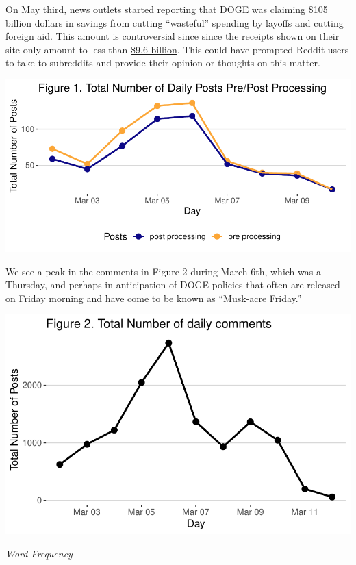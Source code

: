 \documentclass[
  12pt]{article}
\begin{document}
On May third, news outlets started reporting that DOGE was claiming
\$105 billion dollars in savings from cutting ``wasteful'' spending by
layoffs and cutting foreign aid. This amount is controversial since
since the receipts shown on their site only amount to less than
\href{https://abcnews.go.com/US/doge-website-now-saved-105-billion-backtracked-earlier/story?id=119408347}{\$9.6
billion}. This could have prompted Reddit users to take to subreddits
and provide their opinion or thoughts on this matter.

\includegraphics{paper_files/figure-pdf/unnamed-chunk-3-1.pdf}

We see a peak in the comments in Figure 2 during March 6th, which was a
Thursday, and perhaps in anticipation of DOGE policies that often are
released on Friday morning and have come to be known as
``\href{https://smotus.substack.com/p/friday-night-musk-acre}{Musk-acre
Friday}.''

\includegraphics{paper_files/figure-pdf/unnamed-chunk-4-1.pdf}

\emph{Word Frequency}
\end{document}
